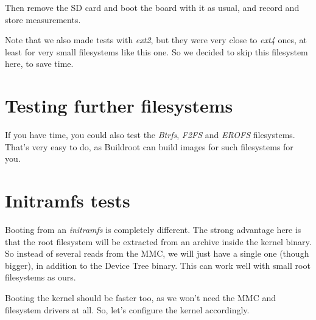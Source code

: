 Then remove the SD card and boot the board with it as usual, and record
and store measurements.

Note that we also made tests with {\em ext2}, but they were very close
to {\em ext4} ones, at least for very small filesystems like this one.
So we decided to skip this filesystem here, to save time.

\section{Testing further filesystems}

If you have time, you could also test the {\em Btrfs}, {\em F2FS} and
{\em EROFS} filesystems. That's very easy to do, as Buildroot can build
images for such filesystems for you.

\section{Initramfs tests}

Booting from an {\em initramfs} is completely different. The strong
advantage here is that the root filesystem will be extracted from an
archive inside the kernel binary. So instead of several reads from the
MMC, we will just have a single one (though bigger), in addition to the
Device Tree binary.  This can work well with small root filesystems as ours.

Booting the kernel should be faster too, as we won't need the MMC and
filesystem drivers at all. So, let's configure the kernel accordingly.

